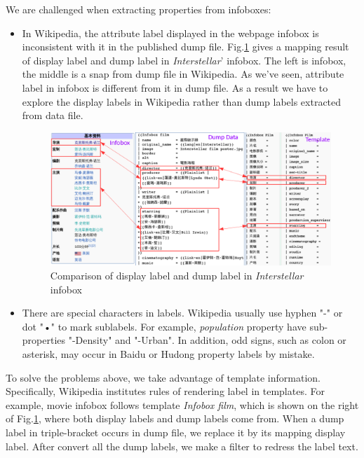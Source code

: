 \documentclass[runningheads,a4paper]{llncs}
\begin{document}
We are challenged when extracting properties from infoboxes:
\begin{itemize}
    \item In Wikipedia, the attribute label displayed in the webpage infobox is inconsistent with it in the published dump file. Fig.\ref{fig:infobox-template} gives a mapping result of display label and dump label in \emph{Interstellar}' infobox. The left is infobox, the middle is a snap from dump file in Wikipedia. As we've seen, attribute label in infobox is different from it in dump file. As a result we have to explore the display labels in Wikipedia rather than dump labels extracted from data file. 
    \begin{figure}[ht]
        \centerline{\includegraphics[width=1\columnwidth]{fig/infobox-template}}
        \label{fig:infobox-template}
        \caption{Comparison of display label and dump label in \emph{Interstellar} infobox}
    \end{figure}%
\item There are special characters in labels. Wikipedia usually use hyphen "-" or dot "•" to mark sublabels. For example, \emph{population} property have sub-properties "-Density" and "-Urban". In addition, odd signs, such as colon or asterisk, may occur in Baidu or Hudong property labels by mistake.
\end{itemize}

To solve the problems above, we take advantage of template information. Specifically, Wikipedia institutes rules of rendering label in templates. For example, movie infobox follows template \emph{Infobox film}, which is shown on the right of Fig.\ref{fig:infobox-template}, where both display labels and dump labels come from. When a dump label in triple-bracket occurs in dump file, we replace it by its mapping display label. After convert all the dump labels, we make a filter to redress the label text.
\end{document}
